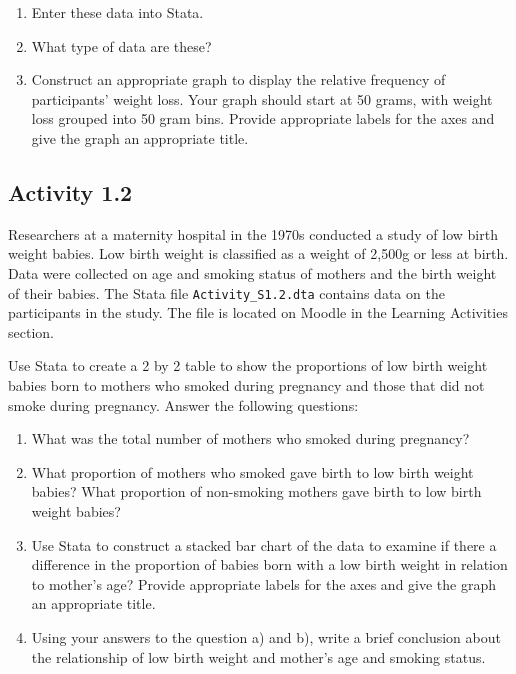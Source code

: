 \documentclass[
]{memoir}
\providecommand{\tightlist}{%
  \setlength{\itemsep}{0pt}\setlength{\parskip}{0pt}}
\begin{document}
\begin{enumerate}
\def\labelenumi{\alph{enumi})}
\tightlist
\item
  Enter these data into Stata.
\item
  What type of data are these?
\item
  Construct an appropriate graph to display the relative frequency of participants' weight loss. Your graph should start at 50 grams, with weight loss grouped into 50 gram bins. Provide appropriate labels for the axes and give the graph an appropriate title.
\end{enumerate}

\hypertarget{activity-1.2}{%
\subsection*{Activity 1.2}\label{activity-1.2}}

Researchers at a maternity hospital in the 1970s conducted a study of low birth weight babies. Low birth weight is classified as a weight of 2,500g or less at birth. Data were collected on age and smoking status of mothers and the birth weight of their babies. The Stata file \texttt{Activity\_S1.2.dta} contains data on the participants in the study. The file is located on Moodle in the Learning Activities section.

Use Stata to create a 2 by 2 table to show the proportions of low birth weight babies born to mothers who smoked during pregnancy and those that did not smoke during pregnancy. Answer the following questions:

\begin{enumerate}
\def\labelenumi{\alph{enumi})}
\tightlist
\item
  What was the total number of mothers who smoked during pregnancy?
\item
  What proportion of mothers who smoked gave birth to low birth weight babies? What proportion of non-smoking mothers gave birth to low birth weight babies?
\item
  Use Stata to construct a stacked bar chart of the data to examine if there a difference in the proportion of babies born with a low birth weight in relation to mother's age? Provide appropriate labels for the axes and give the graph an appropriate title.
\item
  Using your answers to the question a) and b), write a brief conclusion about the relationship of low birth weight and mother's age and smoking status.
\end{enumerate}
\end{document}
